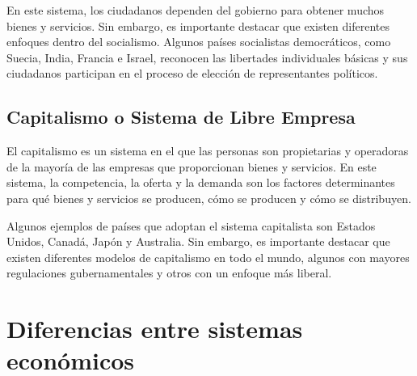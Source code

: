 \documentclass[
  man,
  floatsintext,
  longtable,
  a4paper,
  nolmodern,
  notxfonts,
  notimes,
  12pt,
  colorlinks=true,linkcolor=blue,citecolor=blue,urlcolor=blue]{apa7}
\begin{document}
En este sistema, los ciudadanos dependen del gobierno para obtener
muchos bienes y servicios. Sin embargo, es importante destacar que
existen diferentes enfoques dentro del socialismo. Algunos países
socialistas democráticos, como Suecia, India, Francia e Israel,
reconocen las libertades individuales básicas y sus ciudadanos
participan en el proceso de elección de representantes políticos.

\subsection{Capitalismo o Sistema de Libre
Empresa}\label{capitalismo-o-sistema-de-libre-empresa}

El capitalismo es un sistema en el que las personas son propietarias y
operadoras de la mayoría de las empresas que proporcionan bienes y
servicios. En este sistema, la competencia, la oferta y la demanda son
los factores determinantes para qué bienes y servicios se producen, cómo
se producen y cómo se distribuyen.

Algunos ejemplos de países que adoptan el sistema capitalista son
Estados Unidos, Canadá, Japón y Australia. Sin embargo, es importante
destacar que existen diferentes modelos de capitalismo en todo el mundo,
algunos con mayores regulaciones gubernamentales y otros con un enfoque
más liberal.

\section{Diferencias entre sistemas
económicos}\label{diferencias-entre-sistemas-econuxf3micos}
\end{document}
